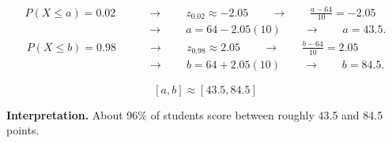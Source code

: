 	
	\[
	\begin{aligned}
	P(X \leq a)=0.02
	&\qquad \longrightarrow \qquad z_{0.02}\approx -2.05
	\qquad \longrightarrow \qquad \frac{a-64}{10}=-2.05\\
	&\qquad \longrightarrow \qquad a=64-2.05(10)
	\qquad \longrightarrow \qquad a=43.5.
	\end{aligned}
	\]
	\[
	\begin{aligned}
	P(X \leq b)=0.98
	&\qquad \longrightarrow \qquad z_{0.98}\approx 2.05
	\qquad \longrightarrow \qquad \frac{b-64}{10}=2.05\\
	&\qquad \longrightarrow \qquad b=64+2.05(10)
	\qquad \longrightarrow \qquad b=84.5.
	\end{aligned}
	\]
	
	\[
	[a,b] \approx [43.5, 84.5]
	\]
	
	\textbf{Interpretation.} About 96\% of students score between roughly 43.5 and 84.5 points.
	

